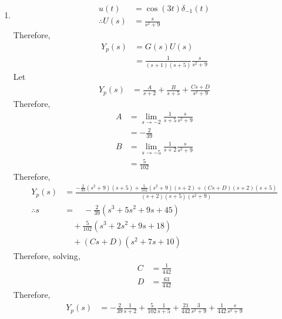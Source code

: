 \documentclass[fleqn, a4paper, 11pt, oneside]{amsart}
\theoremstyle{definition}
\theoremstyle{theorem}
\begin{document}
\begin{solution}
	\begin{enumerate}
		\item
			\begin{align*}
				u(t)            & = \cos(3 t) \delta_{-1}(t) \\
				\therefore U(s) & = \frac{s}{s^2 + 9}
			\end{align*}
			Therefore,
			\begin{align*}
				Y_p(s) & = G(s) U(s) \\
                                       & = \frac{1}{(s + 1) (s + 5)} \frac{s}{s^2 + 9}
			\end{align*}
			Let
			\begin{align*}
				Y_p(s) & = \frac{A}{s + 2} + \frac{B}{s + 5} + \frac{C s + D}{s^2 + 9}
			\end{align*}
			Therefore,
			\begin{align*}
				A & = \lim\limits_{s \to -2} \frac{1}{s + 5} \frac{s}{s^2 + 9} \\
                                  & = -\frac{2}{39}                                            \\
				B & = \lim\limits_{s \to -5} \frac{1}{s + 2} \frac{s}{s^2 + 9} \\
                                  & = \frac{5}{102}
			\end{align*}
			Therefore,
			\begin{align*}
				Y_p(s)       & = \frac{-\frac{2}{39} (s^2 + 9) (s + 5) + \frac{5}{102} (s^2 + 9) (s + 2) + (C s + D) (s + 2) (s + 5)}{(s + 2) (s + 5) (s^2 + 9)} \\
				\therefore s & = \quad -\frac{2}{39} \left( s^3 + 5 s^2 + 9 s + 45 \right)                                                                       \\
                                             & \quad + \frac{5}{102} \left( s^3 + 2 s^2 + 9 s + 18 \right)                                                                       \\
                                             & \quad + (C s + D) \left( s^2 + 7 s + 10 \right)
			\end{align*}
			Therefore, solving,
			\begin{align*}
				C & = \frac{1}{442} \\
				D & = \frac{63}{442}
			\end{align*}
			Therefore,
			\begin{align*}
				Y_p(s) & = -\frac{2}{39} \frac{1}{s + 2} + \frac{5}{102} \frac{1}{s + 5} + \frac{21}{442} \frac{3}{s^2 + 9} + \frac{1}{442} \frac{s}{s^2 + 9}

\end{align*}
\end{enumerate}
\end{solution}
\end{document}
